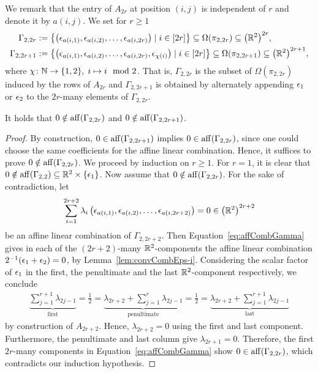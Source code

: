 We remark that the entry of $A_{2r}$ at position $(i,j)$ is independent of $r$ and denote it by $a(i,j)$. We set for $r \geq 1$
\begin{align*}
	\Gamma_{2,2r} &:= \left\lbrace \left( \epsilon_{a(i,1)}, \epsilon_{a(i,2)}, \ldots, \epsilon_{a(i,2r)} \right) \mid i \in [2r] \right\rbrace \subseteq \Omega(\pi_{2,2r}) \subseteq \big( \mathbb R^2 \big)^{2r},\\
	\Gamma_{2,2r+1} &:= \left\lbrace \left( \epsilon_{a(i,1)}, \epsilon_{a(i,2)}, \ldots, \epsilon_{a(i,2r)}, \epsilon_{\chi(i)} \right) \mid i \in [2r] \right\rbrace \subseteq \Omega(\pi_{2,2r+1}) \subseteq \big( \mathbb R^2 \big)^{2r+1},
\end{align*}
where $\chi \colon \mathbb N \to \{1,2\}, \; i \mapsto i \mod 2$. That is, $\Gamma_{2,2r}$ is the subset of $\Omega(\pi_{2,2r})$ induced by the rows of $A_{2r}$ and $\Gamma_{2,2r+1}$ is obtained by alternately appending $\epsilon_1$ or $\epsilon_2$ to the $2r$-many elements of $\Gamma_{2,2r}$.

\begin{lemma} \label{lem:affHullQubits}
	It holds that $0 \notin \operatorname{aff}(\Gamma_{2,2r})$ and $0 \notin \operatorname{aff}(\Gamma_{2,2r+1})$.
\end{lemma}

\begin{proof}
	By construction, $0 \in \operatorname{aff}(\Gamma_{2,2r+1})$ implies $0 \in \operatorname{aff}(\Gamma_{2,2r})$, since one could choose the same coefficients for the affine linear combination. Hence, it suffices to prove $0 \notin \operatorname{aff}(\Gamma_{2,2r})$. We proceed by induction on $r \geq 1$. For $r=1$, it is clear that $0 \notin \operatorname{aff}(\Gamma_{2,2}) \subseteq \mathbb R^2 \times \lbrace \epsilon_1 \rbrace$.
	Now assume that $0 \notin \operatorname{aff}(\Gamma_{2,2r})$. For the sake of contradiction, let
	\begin{equation}\label{eq:affCombGamma}
		\sum_{i=1}^{2r+2} \lambda_i \left( \epsilon_{a(i,1)}, \epsilon_{a(i,2)}, \ldots, \epsilon_{a(i,2r+2)} \right) = 0 \in \left( \mathbb R^2 \right)^{2r+2}
	\end{equation}
	be an affine linear combination of $\Gamma_{2,2r+2}$. Then Equation~\eqref{eq:affCombGamma} gives in each of the $(2r+2)$-many $\mathbb R^2$-components the affine linear combination $2^{-1} (\epsilon_1 + \epsilon_2) = 0$, by Lemma~\ref{lem:convCombEps-i}. Considering the scalar factor of $\epsilon_1$ in the first, the penultimate and the last $\mathbb R^{2}$-component respectively, we conclude
	\begin{align*}
		\underbrace{ \sum_{j=1}^{r+1} \lambda_{2j-1} }_{\text{first}} = \frac{1}{2}
		= \underbrace{ \lambda_{2r+2} + \sum_{j=1}^{r} \lambda_{2j-1} }_{\text{penultimate}} 
		= \frac{1}{2} = \underbrace { \lambda_{2r+2} + \sum_{j=1}^{r+1} \lambda_{2j-1} }_{\text{last}}
	\end{align*}
	by construction of $A_{2r+2}$. Hence, $\lambda_{2r+2} = 0$ using the first and last component. Furthermore, the penultimate and last column give $\lambda_{2r+1} = 0$. Therefore, the first $2r$-many components in Equation~\eqref{eq:affCombGamma} show $0 \in \operatorname{aff}(\Gamma_{2,2r})$, which contradicts our induction hypothesis.
\end{proof}

